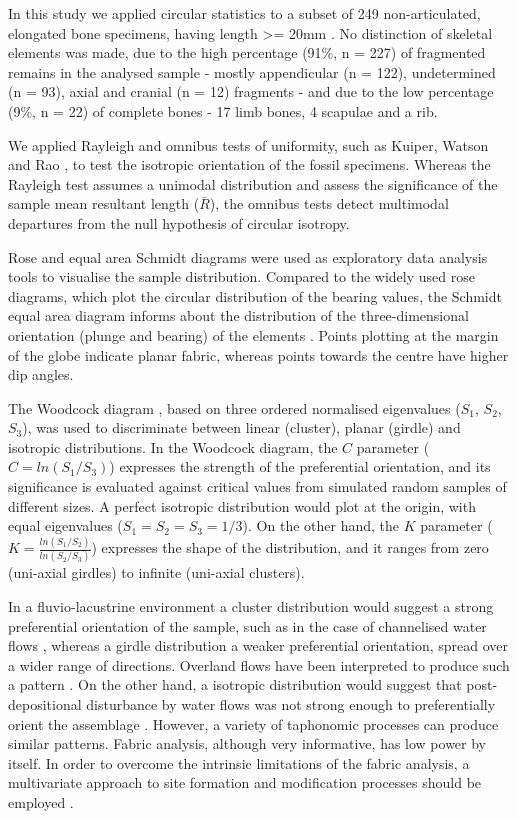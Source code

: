 \documentclass[review,times,authoryear]{elsarticle} %
\begin{document}
In this study we applied circular statistics to a subset of 249 non-articulated, elongated bone specimens, having length >= 20mm \citep{Dominguez-Rodrigo2014}. No distinction of skeletal elements was made, due to the high percentage (91\%, n = 227) of fragmented remains in the analysed sample - mostly appendicular (n = 122), undetermined (n = 93), axial and cranial (n = 12) fragments - and due to the low percentage (9\%, n = 22) of complete bones - 17 limb bones, 4 scapulae and a rib.

We applied Rayleigh and omnibus tests of uniformity, such as Kuiper, Watson and Rao \citep{Jammalamadaka2001}, to test the isotropic orientation of the fossil specimens. Whereas the Rayleigh test assumes a unimodal distribution and assess the significance of the sample mean resultant length ($\bar{R}$), the omnibus tests detect multimodal departures from the null hypothesis of circular isotropy.

Rose and equal area Schmidt diagrams were used as exploratory data analysis tools to visualise the sample distribution. Compared to the widely used rose diagrams, which plot the circular distribution of the bearing values, the Schmidt equal area diagram informs about the distribution of the three-dimensional orientation (plunge and bearing) of the elements \citep{Fiorillo1988}. Points plotting at the margin of the globe indicate planar fabric, whereas points towards the centre have higher dip angles.

The Woodcock diagram \citep{Woodcock1983}, based on three ordered normalised eigenvalues ($S_1$, $S_2$, $S_3$), was used to discriminate between linear (cluster), planar (girdle) and isotropic distributions. In the Woodcock diagram, the $C$ parameter ($C=ln(S_1/S_3)$) expresses the strength of the preferential orientation, and its significance is evaluated against critical values from simulated random samples of different sizes. A perfect isotropic distribution would plot at the origin, with equal eigenvalues ($S_1=S_2=S_3=1/3$). On the other hand, the $K$ parameter ($K=\frac{ln(S_1/S_2)}{ln(S_2/S_3)}$) expresses the shape of the distribution, and it ranges from zero (uni-axial girdles) to infinite (uni-axial clusters).

In a fluvio-lacustrine environment a cluster distribution would suggest a strong preferential orientation of the sample, such as in the case of channelised water flows \citep{Petraglia1994}, whereas a girdle distribution a weaker preferential orientation, spread over a wider range of directions. Overland flows have been interpreted to produce such a pattern \citep{Organista2017}. On the other hand, a isotropic distribution would suggest that post-depositional disturbance by water flows was not strong enough to preferentially orient the assemblage \citep{Dominguez-Rodrigo2014c}. However, a variety of taphonomic processes can produce similar patterns. Fabric analysis, although very informative, has low power by itself. In order to overcome the intrinsic limitations of the fabric analysis, a multivariate approach to site formation and modification processes should be employed \citep{Lenoble2004}.
\end{document}
